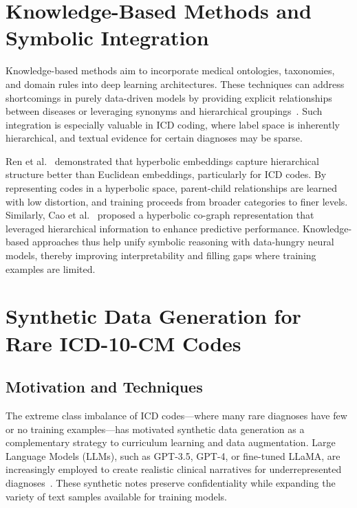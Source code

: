 \section{Knowledge-Based Methods and Symbolic Integration}

Knowledge-based methods aim to incorporate medical ontologies, taxonomies, and domain rules into deep learning architectures. These techniques can address shortcomings in purely data-driven models by providing explicit relationships between diseases or leveraging synonyms and hierarchical groupings~\citep{xie2019ehr, teng2020explainable}. Such integration is especially valuable in ICD coding, where label space is inherently hierarchical, and textual evidence for certain diagnoses may be sparse.

Ren et al.~\citep{ren2022hicu} demonstrated that hyperbolic embeddings capture hierarchical structure better than Euclidean embeddings, particularly for ICD codes. By representing codes in a hyperbolic space, parent-child relationships are learned with low distortion, and training proceeds from broader categories to finer levels. Similarly, Cao et al.~\citep{cao2020hypercore} proposed a hyperbolic co-graph representation that leveraged hierarchical information to enhance predictive performance. Knowledge-based approaches thus help unify symbolic reasoning with data-hungry neural models, thereby improving interpretability and filling gaps where training examples are limited.

\section{Synthetic Data Generation for Rare ICD-10-CM Codes}

\subsection{Motivation and Techniques}

The extreme class imbalance of ICD codes—where many rare diagnoses have few or no training examples—has motivated synthetic data generation as a complementary strategy to curriculum learning and data augmentation. Large Language Models (LLMs), such as GPT-3.5, GPT-4, or fine-tuned LLaMA, are increasingly employed to create realistic clinical narratives for underrepresented diagnoses~\citep{kumichev2024medsyn, falis2024gpt35}. These synthetic notes preserve confidentiality while expanding the variety of text samples available for training models.

